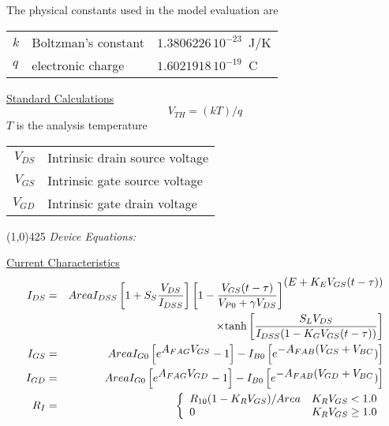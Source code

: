 \documentclass{article}
\begin{document}
\noindent The physical constants used in the model evaluation are
\begin{center}
\begin{tabular}{|l|l|l|}
\hline
$k$ & Boltzman's constant           &  $1.3806226\,10^{-23}$~J/K\\
$q$ & electronic charge             & $1.6021918\,10^{-19}$~C\\
\hline
\end{tabular}
\end{center}

\noindent\underline{Standard Calculations}
\begin{equation}
V_{TH} = (k T)/q
\end{equation}
$T$ is the analysis temperature
\newline
\begin{center}
\begin{tabular}{r l}
$V_{DS}$ & Intrinsic drain source voltage \\
$V_{GS}$ & Intrinsic gate source voltage \\
$V_{GD}$ & Intrinsic gate drain voltage
\end{tabular}
\end{center}
\line(1,0){425}
\newline
\noindent\textit{Device Equations:}
\newline

\noindent\underline{Current Characteristics}
\begin{eqnarray}
I_{DS}&=&Area I_{DSS} \left[ 1 + S_S {{V_{DS}} \over {I_{DSS}}} \right]
         \left[ 1 - {{V_{GS}(t-\tau)} \over {V_{P0} + \gamma V_{DS}}}
         \right]^{\textstyle (E + K_E V_{GS}(t-\tau))} \nonumber\\
      & &\hspace*{1in} \times \mbox{tanh}\left[  {{S_L V_{DS}} \over
                {I_{DSS} ( 1 - K_G V_{GS}(t-\tau))}} \right]
       \\
I_{GS}&=&Area I_{G0} \left[ e^{\textstyle A_{FAG}V_{GS}} -1 \right]
         - I_{B0} \left[ e^{\textstyle -A_{FAB}(V_{GS}+ V_{BC}})  \right]
       \\
I_{GD}&=&Area I_{G0} \left[ e^{\textstyle A_{FAG}V_{GD}} -1 \right]
         - I_{B0} \left[ e^{\textstyle -A_{FAB}(V_{GD}+ V_{BC}})  \right]
       \\
R_I&=& \left\{ \begin{array}{ll}
       R_{10} ( 1 - K_R V_{GS} )/Area  & K_R V_{GS} < 1.0\\
       0                         & K_R V_{GS} \ge 1.0\\
      \end{array} \right.
\end{eqnarray}
\end{document}
